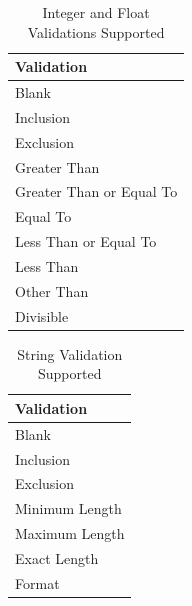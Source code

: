 \documentclass[a4paper,12pt]{article}
\begin{document}
\begin{table}
\caption{Integer and Float Validations Supported}
\label{tab:integersupported}
    \begin{tabular}{|l|}
        \hline
        Validation               \\ \hline
        Blank                    \\ 
        Inclusion                \\ 
        Exclusion                \\ 
        Greater Than             \\ 
        Greater Than or Equal To \\ 
        Equal To                 \\ 
        Less Than or Equal To    \\ 
        Less Than                \\ 
        Other Than               \\ 
        Divisible                \\
        \hline
    \end{tabular}
\end{table}

\begin{table}
\caption{String Validation Supported}
\label{tab:stringsupported}
    \begin{tabular}{|l|}
        \hline
        Validation     \\ \hline
        Blank          \\ 
        Inclusion      \\ 
        Exclusion      \\ 
        Minimum Length \\ 
        Maximum Length \\ 
        Exact Length   \\ 
        Format         \\
        \hline
    \end{tabular}
\end{table}




\end{document}
